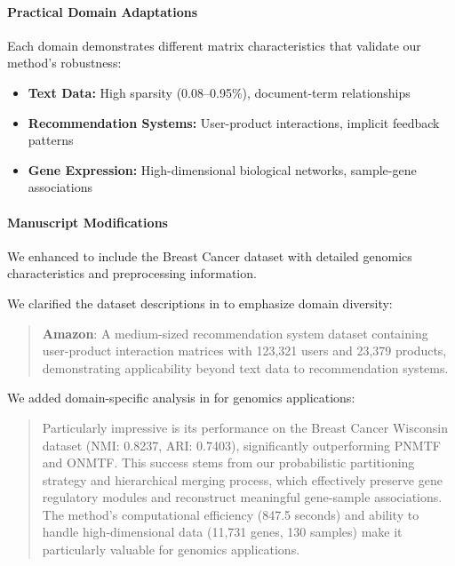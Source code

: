 \documentclass{ar2rc}
\theoremstyle{definition}
\theoremstyle{remark} %
\begin{document}
\paragraph{Practical Domain Adaptations}

Each domain demonstrates different matrix characteristics that validate our method's robustness:
\begin{itemize}
  \item \textbf{Text Data:} High sparsity (0.08--0.95\%), document-term relationships
  \item \textbf{Recommendation Systems:} User-product interactions, implicit feedback patterns
  \item \textbf{Gene Expression:} High-dimensional biological networks, sample-gene associations
\end{itemize}

\paragraph{Manuscript Modifications}

We enhanced  to include the Breast Cancer dataset with detailed genomics characteristics and preprocessing information.

We clarified the dataset descriptions in  to emphasize domain diversity:

\begin{quote}
  \textbf{Amazon}: A medium-sized recommendation system dataset containing user-product interaction matrices with 123,321 users and 23,379 products, demonstrating applicability beyond text data to recommendation systems.
\end{quote}

We added domain-specific analysis in  for genomics applications:

\begin{quote}
  Particularly impressive is its performance on the Breast Cancer Wisconsin dataset (NMI: 0.8237, ARI: 0.7403), significantly outperforming PNMTF and ONMTF. This success stems from our probabilistic partitioning strategy and hierarchical merging process, which effectively preserve gene regulatory modules and reconstruct meaningful gene-sample associations. The method's computational efficiency (847.5 seconds) and ability to handle high-dimensional data (11,731 genes, 130 samples) make it particularly valuable for genomics applications.
\end{quote}
\end{document}
